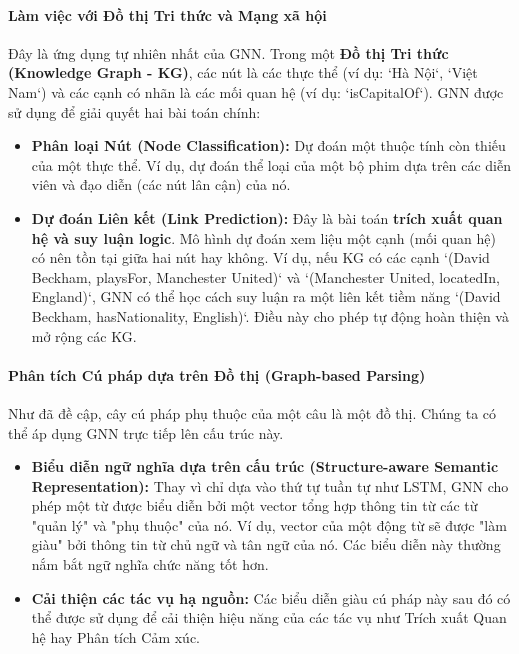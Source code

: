 \paragraph{Làm việc với Đồ thị Tri thức và Mạng xã hội}
Đây là ứng dụng tự nhiên nhất của GNN. Trong một \textbf{Đồ thị Tri thức (Knowledge Graph - KG)}, các nút là các thực thể (ví dụ: `Hà Nội`, `Việt Nam`) và các cạnh có nhãn là các mối quan hệ (ví dụ: `isCapitalOf`).
GNN được sử dụng để giải quyết hai bài toán chính:
\begin{itemize}
    \item \textbf{Phân loại Nút (Node Classification):} Dự đoán một thuộc tính còn thiếu của một thực thể. Ví dụ, dự đoán thể loại của một bộ phim dựa trên các diễn viên và đạo diễn (các nút lân cận) của nó.
    \item \textbf{Dự đoán Liên kết (Link Prediction):} Đây là bài toán \textbf{trích xuất quan hệ và suy luận logic}. Mô hình dự đoán xem liệu một cạnh (mối quan hệ) có nên tồn tại giữa hai nút hay không. Ví dụ, nếu KG có các cạnh `(David Beckham, playsFor, Manchester United)` và `(Manchester United, locatedIn, England)`, GNN có thể học cách suy luận ra một liên kết tiềm năng `(David Beckham, hasNationality, English)`. Điều này cho phép tự động hoàn thiện và mở rộng các KG.
\end{itemize}

\paragraph{Phân tích Cú pháp dựa trên Đồ thị (Graph-based Parsing)}
Như đã đề cập, cây cú pháp phụ thuộc của một câu là một đồ thị. Chúng ta có thể áp dụng GNN trực tiếp lên cấu trúc này.
\begin{itemize}
    \item \textbf{Biểu diễn ngữ nghĩa dựa trên cấu trúc (Structure-aware Semantic Representation):} Thay vì chỉ dựa vào thứ tự tuần tự như LSTM, GNN cho phép một từ được biểu diễn bởi một vector tổng hợp thông tin từ các từ "quản lý" và "phụ thuộc" của nó. Ví dụ, vector của một động từ sẽ được "làm giàu" bởi thông tin từ chủ ngữ và tân ngữ của nó. Các biểu diễn này thường nắm bắt ngữ nghĩa chức năng tốt hơn.
    \item \textbf{Cải thiện các tác vụ hạ nguồn:} Các biểu diễn giàu cú pháp này sau đó có thể được sử dụng để cải thiện hiệu năng của các tác vụ như Trích xuất Quan hệ hay Phân tích Cảm xúc.
\end{itemize}

